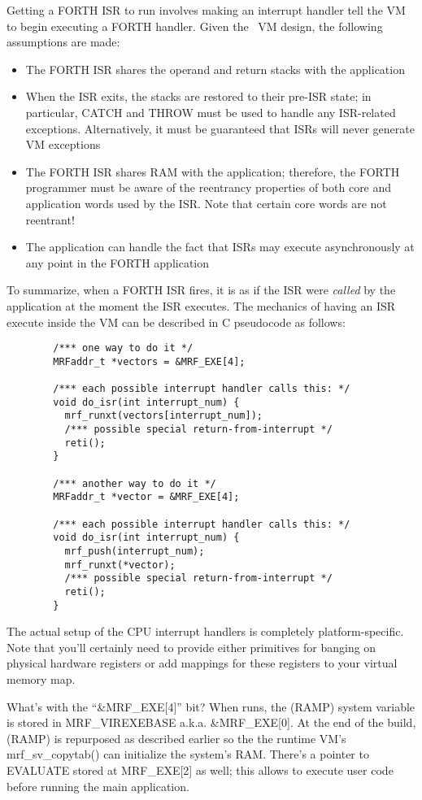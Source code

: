 \documentclass{article}
\begin{document}
Getting a FORTH ISR to run involves making an interrupt handler tell the
VM to begin executing a FORTH handler. Given the \M\ VM design, the
following assumptions are made:
\begin{itemize}
\item The FORTH ISR shares the operand and return stacks with the
  application
\item When the ISR exits, the stacks are restored to their pre-ISR
  state; in particular, CATCH and THROW must be used to handle any
  ISR-related exceptions. Alternatively, it must be guaranteed that ISRs
  will never generate VM exceptions
\item The FORTH ISR shares RAM with the application; therefore, the
  FORTH programmer must be aware of the reentrancy properties of both
  core and application words used by the ISR. Note that certain core
  words are not reentrant!
\item The application can handle the fact that ISRs may execute
  asynchronously at any point in the FORTH application
\end{itemize}
To summarize, when a FORTH ISR fires, it is as if the ISR were
\textit{called} by the application at the moment the ISR executes. The
mechanics of having an ISR execute inside the VM can be described in C
pseudocode as follows:
\begin{verbatim}
        /*** one way to do it */
        MRFaddr_t *vectors = &MRF_EXE[4];

        /*** each possible interrupt handler calls this: */
        void do_isr(int interrupt_num) {
          mrf_runxt(vectors[interrupt_num]);
          /*** possible special return-from-interrupt */
          reti();
        }

        /*** another way to do it */
        MRFaddr_t *vector = &MRF_EXE[4];

        /*** each possible interrupt handler calls this: */
        void do_isr(int interrupt_num) {
          mrf_push(interrupt_num);
          mrf_runxt(*vector);
          /*** possible special return-from-interrupt */
          reti();
        }
\end{verbatim}
The actual setup of the CPU interrupt handlers is completely
platform-specific. Note that you'll certainly need to provide
either primitives for banging on physical hardware registers or add
mappings for these registers to your virtual memory map.

What's with the ``\&MRF\_EXE[4]'' bit? When  runs, the
(RAMP) system variable is stored in MRF\_VIREXEBASE
a.k.a. \&MRF\_EXE[0]. At the end of the build, (RAMP) is repurposed as
described earlier so the the runtime VM's mrf\_sv\_copytab() can
initialize the system's RAM. There's a pointer to EVALUATE stored at
MRF\_EXE[2] as well; this allows  to execute user code
before running the main application.
\end{document}
